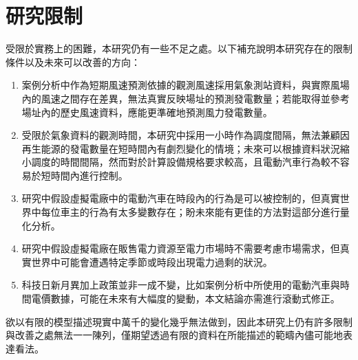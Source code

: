 \section{研究限制}

受限於實務上的困難，本研究仍有一些不足之處。以下補充說明本研究存在的限制條件以及未來可以改善的方向：

\begin{enumerate}[label = (\arabic*)]
  \item 案例分析中作為短期風速預測依據的觀測風速採用氣象測站資料，與實際風場內的風速之間存在差異，無法真實反映場址的預測發電數量；若能取得並參考場址內的歷史風速資料，應能更準確地預測風力發電數量。
  \item 受限於氣象資料的觀測時間，本研究中採用一小時作為調度間隔，無法兼顧因再生能源的發電數量在短時間內有劇烈變化的情境；未來可以根據資料狀況縮小調度的時間間隔，然而對於計算設備規格要求較高，且電動汽車行為較不容易於短時間內進行控制。
  \item 研究中假設虛擬電廠中的電動汽車在時段內的行為是可以被控制的，但真實世界中每位車主的行為有太多變數存在；盼未來能有更佳的方法對這部分進行量化分析。
  \item 研究中假設虛擬電廠在販售電力資源至電力市場時不需要考慮市場需求，但真實世界中可能會遭遇特定季節或時段出現電力過剩的狀況。
  \item 科技日新月異加上政策並非一成不變，比如案例分析中所使用的電動汽車與時間電價數據，可能在未來有大幅度的變動，本文結論亦需進行滾動式修正。
\end{enumerate}

欲以有限的模型描述現實中萬千的變化幾乎無法做到，因此本研究上仍有許多限制與改善之處無法一一陳列，僅期望透過有限的資料在所能描述的範疇內儘可能地表達看法。


